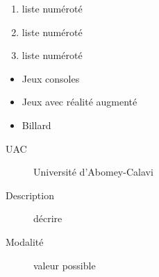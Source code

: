 \documentclass[a4paper,12pt]{report}
\begin{document}
\begin{enumerate}
\item liste numéroté
\item liste numéroté
\item liste numéroté
\end{enumerate}

\begin{itemize}
\item Jeux consoles
\item Jeux avec réalité augmenté
\item Billard
\end{itemize}

\begin{description}
\item[UAC] Université d'Abomey-Calavi
\item[Description] décrire
\item[Modalité] valeur possible
\end{description}
\end{document}
